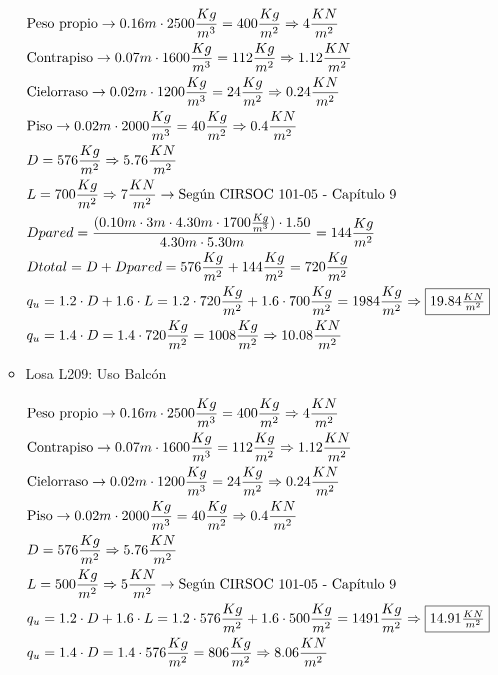 \begin{enumerate}
\begin{itemize}
\begin{align*}
& \text{Peso propio} \rightarrow 0.16m \cdot 2500 \frac{Kg}{m^3} = 400 \frac{Kg}{m^2} \Rightarrow 4 \frac{KN}{m^2} \\
& \text{Contrapiso} \rightarrow 0.07m \cdot 1600 \frac{Kg}{m^3} = 112 \frac{Kg}{m^2} \Rightarrow 1.12 \frac{KN}{m^2} \\
& \text{Cielorraso} \rightarrow 0.02m \cdot 1200 \frac{Kg}{m^3} = 24 \frac{Kg}{m^2} \Rightarrow 0.24 \frac{KN}{m^2} \\
& \text{Piso} \rightarrow 0.02m \cdot 2000 \frac{Kg}{m^3} = 40 \frac{Kg}{m^2} \Rightarrow 0.4 \frac{KN}{m^2} \\
& D = 576 \frac{Kg}{m^2} \Rightarrow 5.76 \frac{KN}{m^2} \\
& L = 700 \frac{Kg}{m^2} \Rightarrow 7 \frac{KN}{m^2} \rightarrow \text{Según CIRSOC 101-05 - Capítulo 9}\\
& Dpared = \frac{(0.10m \cdot 3m \cdot 4.30m \cdot 1700 \frac{Kg}{m^3}) \cdot 1.50}{4.30m \cdot 5.30m} = 144 \frac{Kg}{m^2} \\
& Dtotal = D + Dpared = 576 \frac{Kg}{m^2} + 144 \frac{Kg}{m^2} = 720 \frac{Kg}{m^2} \\
& q_u = 1.2 \cdot D + 1.6 \cdot L = 1.2 \cdot 720 \frac{Kg}{m^2} + 1.6 \cdot 700 \frac{Kg}{m^2} = 1984 \frac{Kg}{m^2} \Rightarrow \framebox{$19.84 \frac{KN}{m^2}$} \\
& q_u = 1.4 \cdot D = 1.4 \cdot 720 \frac{Kg}{m^2} = 1008 \frac{Kg}{m^2} \Rightarrow 10.08 \frac{KN}{m^2}
\end{align*}

\newpage
\item Losa L209: Uso Balcón

\begin{align*}
& \text{Peso propio} \rightarrow 0.16m \cdot 2500 \frac{Kg}{m^3} = 400 \frac{Kg}{m^2} \Rightarrow 4 \frac{KN}{m^2} \\
& \text{Contrapiso} \rightarrow 0.07m \cdot 1600 \frac{Kg}{m^3} = 112 \frac{Kg}{m^2} \Rightarrow 1.12 \frac{KN}{m^2} \\
& \text{Cielorraso} \rightarrow 0.02m \cdot 1200 \frac{Kg}{m^3} = 24 \frac{Kg}{m^2} \Rightarrow 0.24 \frac{KN}{m^2} \\
& \text{Piso} \rightarrow 0.02m \cdot 2000 \frac{Kg}{m^3} = 40 \frac{Kg}{m^2} \Rightarrow 0.4 \frac{KN}{m^2} \\
& D = 576 \frac{Kg}{m^2} \Rightarrow 5.76 \frac{KN}{m^2} \\
& L = 500 \frac{Kg}{m^2} \Rightarrow 5 \frac{KN}{m^2} \rightarrow \text{Según CIRSOC 101-05 - Capítulo 9}\\
& q_u = 1.2 \cdot D + 1.6 \cdot L = 1.2 \cdot 576 \frac{Kg}{m^2} + 1.6 \cdot 500 \frac{Kg}{m^2} = 1491 \frac{Kg}{m^2} \Rightarrow \framebox{$14.91 \frac{KN}{m^2}$} \\
& q_u = 1.4 \cdot D = 1.4 \cdot 576 \frac{Kg}{m^2} = 806 \frac{Kg}{m^2} \Rightarrow 8.06 \frac{KN}{m^2}
\end{align*}


\end{itemize}
\end{enumerate}
